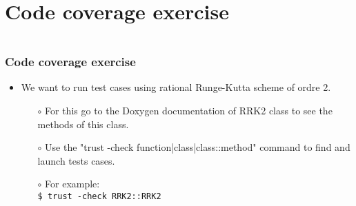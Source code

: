 \documentclass[10pt, hyperref={unicode=true,pdfusetitle, bookmarks=true,bookmarksnumbered=false,bookmarksopen=false, breaklinks=false,pdfborder={0 0 1},backref=true,colorlinks=true,linkcolor=darkblue,pageanchor, urlcolor=darkblue}]{beamer}
\begin{document}
\section{{\bf{Code coverage exercise}}}
\begin{frame}
\begin{columns}[c] 
\tableofcontents[sections={1-4},currentsection, currentsubsection]
\tableofcontents[sections={5-10},currentsection, currentsubsection]
\end{columns}
\end{frame}
\begin{frame}
\frametitle{Code coverage exercise}
\begin{block}{}

\begin{itemize}



\item We want to run test cases using rational Runge-Kutta scheme of ordre 2.

\begin{itemize}
    \item [$\circ$] For this go to the Doxygen documentation of RRK2 class to see the methods of this class.
    \item [$\circ$] Use the "trust -check function|class|class::method" command to find and launch tests cases.
    \item [$\circ$] For example: \\
    \texttt{\$ trust -check RRK2::RRK2}
\end{itemize}
\end{itemize}

\end{block}
\end{frame}
\end{document}
